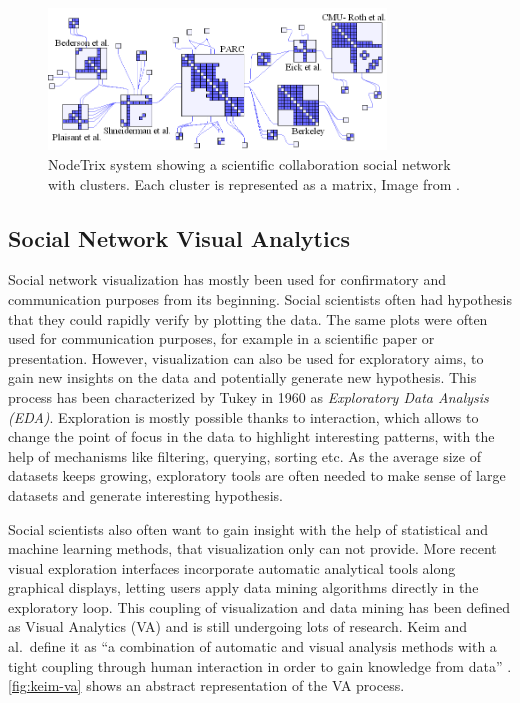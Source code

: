 \begin{figure}
    \centering %
    \includegraphics[width=0.8\textwidth]{static/figures/RelatedWork/NodeTrix.png}
    \caption{NodeTrix system showing a scientific collaboration social network with clusters. Each cluster is represented as a matrix,  Image from \cite{henryNodeTrixHybridVisualization2007}.}
    \label{fig:Riche-NodeTrix}
\end{figure}


\subsection{Social Network Visual Analytics}

Social network visualization has mostly been used for confirmatory and communication purposes from its beginning.
Social scientists often had hypothesis that they could rapidly verify by plotting the data.
The same plots were often used for communication purposes, for example in a scientific paper or presentation.
However, visualization can also be used for exploratory aims, to gain new insights on the data and potentially generate new hypothesis.
This process has been characterized by Tukey in 1960 as \emph{Exploratory Data Analysis (EDA)}.
Exploration is mostly possible thanks to interaction, which allows to change the point of focus in the data to highlight interesting patterns, with the help of mechanisms like filtering, querying, sorting etc.
As the average size of datasets keeps growing, exploratory tools are often needed to make sense of large datasets and generate interesting hypothesis.

Social scientists also often want to gain insight with the help of statistical and machine learning methods, that visualization only can not provide.
More recent visual exploration interfaces incorporate automatic analytical tools along graphical displays, letting users apply data mining algorithms directly in the exploratory loop.
This coupling of visualization and data mining has been defined as Visual Analytics (VA) and is still undergoing lots of research.
Keim and al.\ define it as ``a combination of automatic and visual analysis methods with a tight coupling through human interaction in order to gain knowledge from data'' \cite{keimVisualAnalyticsDefinition2008}. \autoref{fig:keim-va} shows an abstract representation of the VA process.

